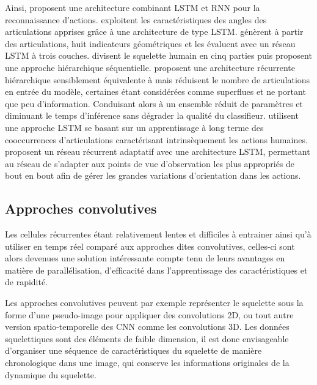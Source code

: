 Ainsi, \cite{baccouche2011sequential} proposent une architecture combinant LSTM et RNN pour la reconnaissance d'actions.
 \cite{avola2018exploiting} exploitent les caractéristiques des angles des articulations apprises grâce à une architecture de type LSTM. 
\cite{zhang2017geometric} génèrent à partir des articulations, huit indicateurs géométriques et les évaluent avec un réseau LSTM à trois couches.
\cite{du2015hierarchical} divisent le squelette humain en cinq parties puis proposent une approche hiérarchique séquentielle.
\cite{shukla2017recurrent} proposent une architecture récurrente hiérarchique sensiblement équivalente à \cite{du2015hierarchical} mais réduisent le nombre de articulations en entrée du modèle, certaines étant considérées comme superflues et ne portant que peu d'information. Conduisant alors à un ensemble réduit de paramètres et diminuant le temps d'inférence sans dégrader la qualité du classifieur.
\cite{shahroudy2016ntu} utilisent une approche LSTM se basant sur un apprentissage à long terme des cooccurrences d'articulations caractérisant intrinsèquement les actions humaines.
\cite{zhang2017view} proposent un réseau récurrent adaptatif avec une architecture LSTM, permettant au réseau de s'adapter aux points de vue d'observation les plus appropriés de bout en bout afin de gérer les grandes variations d'orientation dans les actions.

\subsection{Approches convolutives}
\label{partieconvolutive}
Les cellules récurrentes étant relativement lentes et difficiles à entrainer ainsi qu'à utiliser en temps réel comparé aux approches dites convolutives, celles-ci sont alors devenues une solution intéressante compte tenu de leurs avantages en matière de parallélisation, d'efficacité dans l'apprentissage des caractéristiques et de rapidité.


Les approches convolutives peuvent par exemple représenter le squelette sous la forme d'une pseudo-image pour appliquer des convolutions 2D, ou tout autre version spatio-temporelle des CNN comme les convolutions 3D. Les données squelettiques sont des éléments de faible dimension, il est donc envisageable d'organiser une séquence de caractéristiques du squelette de manière chronologique dans une image, qui conserve les informations originales de la dynamique du squelette.

